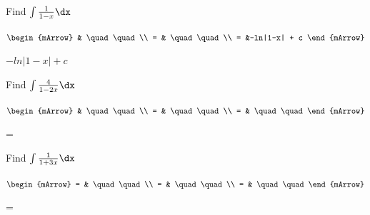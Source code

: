 \clearpage\noindent%
\begin{mtask}[resume]
   \task \begin{exercise} Find $\int \frac{1}{1-x} \dx$
           \begin{envSolution}
             $\begin{mArrow}
                   & \quad \quad              \\
		   		 = & \quad \quad              \\
				 = &-ln|1-x| + c 
              \end{mArrow}$
            \begin{shortsolution}  
			     $-ln|1-x| + c$
			\end{shortsolution}				 
           \end{envSolution}
         \end{exercise}

   \task \begin{exercise} Find $\int \frac{4}{1-2x} \dx$
           \begin{envSolution}
             $\begin{mArrow}
                   & \quad \quad              \\
		   		 = & \quad \quad              \\
				 = & \quad \quad 
              \end{mArrow}$
            \begin{shortsolution}  
			     =$ \quad \quad \quad \quad$
			\end{shortsolution}				 
           \end{envSolution}
         \end{exercise}

   \task \begin{exercise} Find $\int \frac{1}{1+3x} \dx$
           \begin{envSolution}
             $\begin{mArrow}
                 = & \quad \quad              \\
		   		 = & \quad \quad              \\
				 = & \quad \quad 
              \end{mArrow}$
            \begin{shortsolution}  
			     =$ \quad \quad \quad \quad$
			\end{shortsolution}				 
           \end{envSolution}
         \end{exercise}


\end{mtask}
